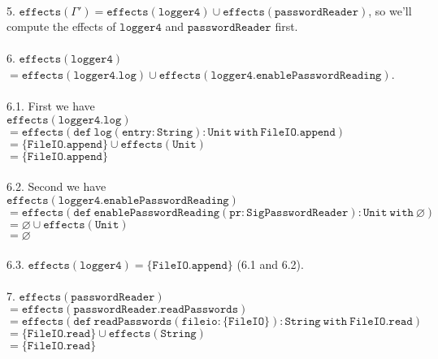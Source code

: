 \documentclass{llncs}
\newcommand{\keywadj}[1]{\mathtt{#1}}
\begin{document}
\paragraph{}
5. $\keywadj{effects(\Gamma') = effects(logger4) \cup effects(passwordReader)}$, so we'll compute the effects of $\keywadj{logger4}$ and $\keywadj{passwordReader}$ first.

\paragraph{}
6. $\keywadj{effects(logger4)}$\\
$\keywadj{= effects(logger4.log) \cup effects(logger4.enablePasswordReading)}$.

\paragraph{}
6.1. First we have \\$\keywadj{effects(logger4.log)}$\\
$\keywadj{= effects(def~log(entry:String):Unit~with~FileIO.append) }$\\
$\keywadj{ = \{ FileIO.append \} \cup effects(Unit) }$\\
$\keywadj{ = \{ FileIO.append \} }$

\paragraph{}
6.2. Second we have\\ $\keywadj{effects(logger4.enablePasswordReading)}$\\
$\keywadj{= effects(def~enablePasswordReading(pr : SigPasswordReader) : Unit~with~\varnothing)}$\\
$\keywadj{= \varnothing \cup effects(Unit)}$\\
$\keywadj{= \varnothing}$

\paragraph{}
6.3. $\keywadj{effects(logger4) = \{ FileIO.append \}}$ (6.1 and 6.2).

\paragraph{}
7. $\keywadj{effects(passwordReader)}$\\
$\keywadj{ = effects(passwordReader.readPasswords)}$\\
$\keywadj{= effects(def~readPasswords(fileio : \{ FileIO \}) : String~with~FileIO.read)}$\\
$\keywadj{= \{ FileIO.read \} \cup effects(String)}$\\
$\keywadj{= \{ FileIO.read \}}$
\end{document}
